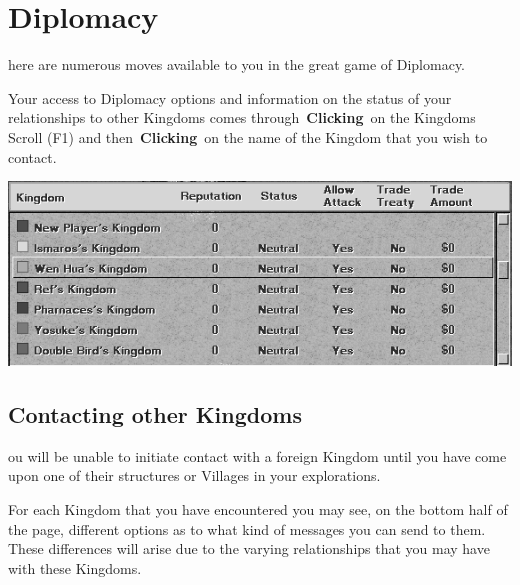 
\chapter{Diplomacy}

here are numerous moves available to you in the great game of Diplomacy.

Your access to Diplomacy options and information on the status of your relationships to other Kingdoms comes through \textbf{Clicking} on the Kingdoms Scroll (F1) and then \textbf{Clicking} on the name of the Kingdom that you wish to contact.

\begin{center}
	\includegraphics[width=0.7\linewidth]{Idimplomacy}
\end{center}

\section{Contacting other Kingdoms}


ou will be unable to initiate contact with a foreign Kingdom until you have come upon one of their structures or Villages in your explorations.

For each Kingdom that you have encountered you may see, on the bottom half of the page, different options as to what kind of messages you can send to them. These differences will arise due to the varying relationships that you may have with these Kingdoms.

